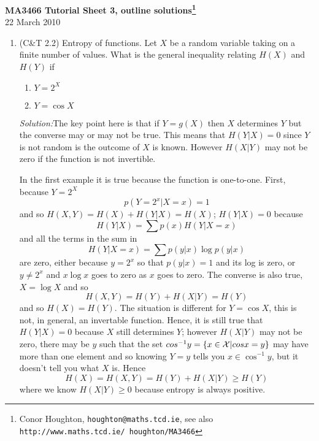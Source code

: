 \documentclass[12pt]{article}
\newcommand{\soln}{\noindent\textit{Solution:}}
\begin{document}
\begin{center}
{\bf MA3466 Tutorial Sheet 3, outline solutions\footnote{Conor Houghton, {\tt houghton@maths.tcd.ie}, see also {\tt http://www.maths.tcd.ie/ houghton/MA3466}}}\\[1cm]{} 22 March 2010
\end{center}
\begin{enumerate}

\item (C\&T 2.2) Entropy of functions. Let $X$ be a random variable taking on a finite number of values. What is the general inequality relating $H(X)$ and $H(Y)$ if 
\begin{enumerate}
\item $Y=2^X$
\item $Y=\cos{X}$
\end{enumerate}

\soln The key point here is that if $Y=g(X)$ then $X$ determines $Y$
but the converse may or may not be true. This means that $H(Y|X)=0$
since $Y$ is not random is the outcome of $X$ is known. However $H(X|Y)$
may not be zero if the function is not invertible.

In the first example it is true because the function is
one-to-one. First, because $Y=2^X$
\begin{equation}
p(Y=2^x|X=x)=1
\end{equation}
and so $H(X,Y)=H(X)+H(Y|X)=H(X)$; $H(Y|X)=0$ because
\begin{equation}
H(Y|X)=\sum p(x)H(Y|X=x)
\end{equation}
and all the terms in the sum in 
\begin{equation}
H(Y|X=x)=\sum p(y|x)\log{p(y|x)}
\end{equation}
are zero, either because $y=2^x$ so that $p(y|x)=1$ and its log is zero, or
$y\not=2^x$ and $x\log{x}$ goes to zero as $x$ goes to zero. The converse is also true, $X=\log{X}$ and so 
\begin{equation}
H(X,Y)=H(Y)+H(X|Y)=H(Y)
\end{equation}
and so $H(X)=H(Y)$. The situation is different for $Y=\cos{X}$, this
is not, in general, an invertable function. Hence, it is still true
that $H(Y|X)=0$ because $X$ still determines $Y$; however $H(X|Y)$ may
not be zero, there may be $y$ such that the set
$cos^{-1}{y}=\{x\in{\cal X}|cos{x}=y\}$ may have more than one element
and so knowing $Y=y$ tells you $x\in \cos^{-1}y$, but it doesn't tell you what $X$ is. Hence
\begin{equation}
H(X)=H(X,Y)=H(Y)+H(X|Y)\ge H(Y)
\end{equation}
where we know $H(X|Y)\ge 0$ because entropy is always positive.


\end{enumerate}
\end{document}
